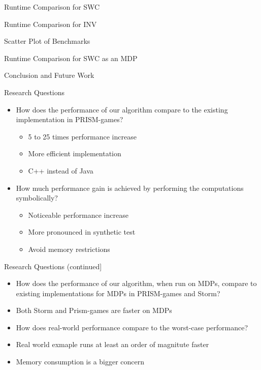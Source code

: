 \begin{frame}{Runtime Comparison for SWC}

\end{frame}
\begin{frame}{Runtime Comparison for INV}

\end{frame}
\begin{frame}{Scatter Plot of Benchmarks}

\end{frame}
\begin{frame}{Runtime Comparison for SWC as an MDP}

\end{frame}
\begin{frame}{Conclusion and Future Work}
\end{frame}


\begin{frame}{Research Questions}
    \begin{itemize}[<+->]
    \item[\textbf{RQ1}:] How does the performance of our algorithm compare to the existing implementation in PRISM-games?
        \begin{itemize}[<+->]
            \item 5 to 25 times performance increase
            \item More efficient implementation
            \item C++ instead of Java
        \end{itemize}
    \item[\textbf{RQ2}:] How much performance gain is achieved by performing the computations symbolically?
        \begin{itemize}[<+->]
            \item Noticeable performance increase
            \item More pronounced in synthetic test
            \item Avoid memory restrictions
        \end{itemize}
\end{itemize}
\end{frame}

\begin{frame}{Research Questions (continued]}
    \begin{itemize}[<+->]
    \item[\textbf{RQ3}:] How does the performance of our algorithm, when run on MDPs, compare to existing implementations for MDPs in PRISM-games and Storm?
        \item Both Storm and Prism-games are faster on MDPs
    \item[\textbf{RQ4}:] How does real-world performance compare to the worst-case performance?
        \item Real world exmaple runs at least an order of magnitute faster
        \item Memory consumption is a bigger concern
\end{itemize}
\end{frame}